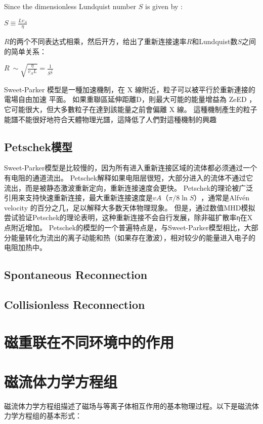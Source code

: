 \documentclass[12pt, a4paper, oneside]{article}
\begin{document}
\begin{spacing}{2.0}
Since the dimensionless Lundquist number $S$ is given by
: 
\begin{center}
    $\displaystyle S \equiv \frac{Lv_A}{\eta}$
\end{center}
$R$的两个不同表达式相乘，然后开方，给出了重新连接速率$R$和Lundquist数$S$之间的简单关系：
\begin{center}
    $\displaystyle R ~ \sim \sqrt{\frac{\eta}{v_A L}} = \frac{1}{S^\frac{1}{2}}$
\end{center}
Sweet-Parker 模型是一種加速機制，在 X 線附近，粒子可以被平行於重新連接的電場自由加速
平面。 如果重聯區延伸距離D，則最大可能的能量增益為 ZeED ，它可能很大，但大多數粒子在達到該能量之前會偏離 X 線。 
這種機制產生的粒子能譜不能很好地符合天體物理光譜，這降低了人們對這種機制的興趣\cite{zweibel2009magnetic}

\subsection{Petschek模型}
Sweet-Parker模型是比较慢的，因为所有进入重新连接区域的流体都必须通过一个有电阻的通道流出。
Petschek解释如果电阻层很短，大部分进入的流体不通过它流出，而是被静态激波重新定向，重新连接速度会更快。
Petschek的理论被广泛引用来支持快速重新连接，最大重新连接速度是$vA（π/8 \ln S）$，通常是Alfvén velocity 的百分之几，足以解释大多数天体物理现象。
但是，通过数值MHD模拟尝试验证Petschek的理论表明，这种重新连接不会自行发展，除非磁扩散率η在X点附近增加。
Petschek的模型的一个普遍特点是，与Sweet-Parker模型相比，大部分能量转化为流出的离子动能和热（如果存在激波），相对较少的能量进入电子的电阻加热中。

\subsection{Spontaneous Reconnection}
\subsection{Collisionless Reconnection}


\section{磁重联在不同环境中的作用}

\section{磁流体力学方程组}

磁流体力学方程组描述了磁场与等离子体相互作用的基本物理过程。以下是磁流体力学方程组的基本形式：


\end{spacing}
\end{document}
